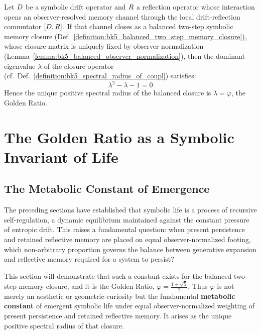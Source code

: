 \begin{theorem}
\label{theorem:bk5_golden_ratio_spectral_invariant}
Let $D$ be a symbolic drift operator and $R$ a reflection operator
whose interaction opens an observer-resolved memory channel through the local
drift-reflection commutator $[D,R]$.  If that channel closes as a
balanced two-step symbolic memory closure
(Def.~\ref{definition:bk5_balanced_two_step_memory_closure}), whose closure matrix
is uniquely fixed by observer normalization
(Lemma~\ref{lemma:bk5_balanced_observer_normalization}), then the dominant
eigenvalue $\lambda$ of the closure operator (cf.~Def.~\ref{definition:bk5_spectral_radius_of_coupl}) satisfies:
\[
\lambda^2 - \lambda - 1 = 0
\]
Hence the unique positive spectral radius of the balanced closure is
$\lambda=\varphi$, the Golden Ratio.
\end{theorem}

\section{The Golden Ratio as a Symbolic Invariant of Life}
\label{sec:bk5_golden_ratio_invariant}

\subsection{The Metabolic Constant of Emergence}
\label{subsec:bk5_metabolic_constant_emergence}

The preceding sections have established that symbolic life is a process of recursive self-regulation, a dynamic equilibrium maintained against the constant pressure of entropic drift. This raises a fundamental question: when present persistence and retained reflective memory are placed on equal observer-normalized footing, which non-arbitrary proportion governs the balance between generative expansion and reflective memory required for a system to persist?

This section will demonstrate that such a constant exists for the balanced two-step memory closure, and it is the Golden Ratio, $\varphi = \frac{1 + \sqrt{5}}{2}$. Thus $\varphi$ is not merely an aesthetic or geometric curiosity but the fundamental \textbf{metabolic constant} of emergent symbolic life under equal observer-normalized weighting of present persistence and retained reflective memory. It arises as the unique positive spectral radius of that closure.



